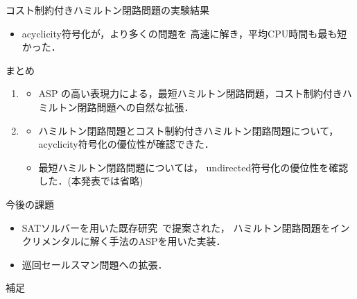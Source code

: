 \documentclass[dvipdfmx,11pt]{beamer}
\begin{document}
\begin{frame}{コスト制約付きハミルトン閉路問題の実験結果}

\begin{itemize}
\item \textsf{acyclicity}符号化が，より多くの問題を
  高速に解き，平均CPU時間も最も短かった．
\end{itemize}
    
\end{frame}

\begin{frame}{まとめ}
    \begin{enumerate}
    \item {}
      \begin{itemize}
      \item ASP の高い表現力による，最短ハミルトン閉路問題，コスト制約付きハミルトン閉路問題への自然な拡張．
      \end{itemize}
    \item {}
      \begin{itemize}
      \item ハミルトン閉路問題とコスト制約付きハミルトン閉路問題について，
        \textsf{acyclicity}符号化の優位性が確認できた．
      \item 最短ハミルトン閉路問題については，
        \textsf{undirected}符号化の優位性を確認した．(本発表では省略)
      \end{itemize}
    \end{enumerate}
  \begin{alertblock}{今後の課題}
    \begin{itemize}
    \item SATソルバーを用いた既存研究~\cite{soh14:jelia2014}で提案された，
      ハミルトン閉路問題をインクリメンタルに解く手法のASPを用いた実装．
    \item 巡回セールスマン問題への拡張．
    \end{itemize}
  \end{alertblock}
\end{frame}


\begin{frame}[noframenumbering]{}
  補足
\end{frame}
\end{document}
